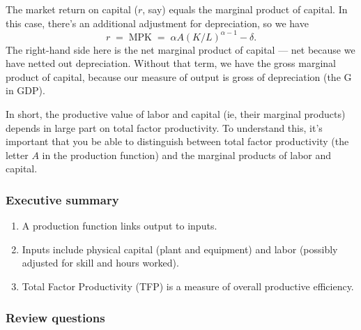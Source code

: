 \documentclass[letterpaper,12pt]{article}
\begin{document}
The market return on capital ($r$, say) equals the marginal product of capital.
In this case, there's an additional adjustment for depreciation, so we have
\[
    r \;=\; \mbox{MPK} \;=\; \alpha A (K/L)^{\alpha-1} - \delta .
\]
The right-hand side here is the net marginal product of capital --- net because
we have netted out depreciation.
Without that term, we have the gross marginal product of capital,
because our measure of output is gross of depreciation (the G in GDP).

In short, the productive value of labor and capital
(ie, their marginal products)
depends in large part on total factor productivity.
To understand this, it's important that you be able to distinguish between
total factor productivity (the letter $A$ in the production function)
and the marginal products of labor and capital.


\subsubsection*{Executive summary}

\begin{enumerate}
\item A production function links output to inputs.

\item Inputs include physical capital (plant and equipment)
and labor (possibly adjusted for skill and hours worked).


\item Total Factor Productivity (TFP) is a measure of overall productive efficiency.
\end{enumerate}



\subsubsection*{Review questions}
\end{document}
